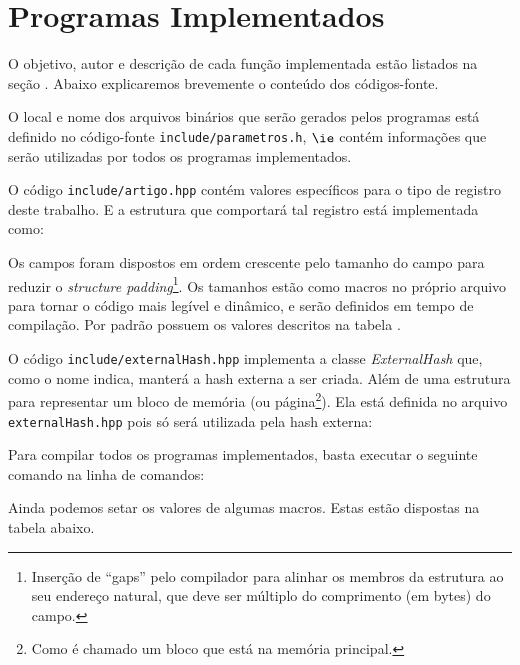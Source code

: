 \section{Programas Implementados}\label{sec:programas_implementados}
% 
O objetivo, autor e descrição de cada função implementada estão listados na seção .
Abaixo explicaremos brevemente o conteúdo dos códigos-fonte.

O local e nome dos arquivos binários que serão gerados pelos programas está definido no código-fonte \texttt{include/parametros.h}, $\ie$ contém informações que serão utilizadas por todos os programas implementados.


O código \texttt{include/artigo.hpp} contém valores específicos para o tipo de registro deste trabalho.
E a estrutura que comportará tal registro está implementada como:

Os campos foram dispostos em ordem crescente pelo tamanho do campo para reduzir o \emph{structure padding}\footnote{Inserção de ``gaps'' pelo compilador para alinhar os membros da estrutura ao seu endereço natural, que deve ser múltiplo do comprimento (em bytes) do campo.}. Os tamanhos estão como macros no próprio arquivo para tornar o código mais legível e dinâmico, e serão definidos em tempo de compilação. Por padrão possuem os valores descritos na tabela .

O código \texttt{include/externalHash.hpp} implementa a classe \emph{ExternalHash} que, como o nome indica, manterá a hash externa a ser criada.
Além de uma estrutura para representar um bloco de memória (ou página\footnote{Como é chamado um bloco que está na memória principal.}).
Ela está definida no arquivo \texttt{externalHash.hpp} pois só será utilizada pela hash externa:

Para compilar todos os programas implementados, basta executar o seguinte comando na linha de comandos:

\newpage

Ainda podemos setar os valores de algumas macros.
Estas estão dispostas na tabela  abaixo.









